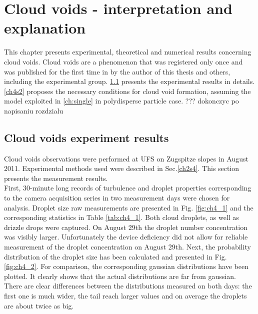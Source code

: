 \documentclass[../main.tex]{subfiles}
\begin{document}
\chapter{Cloud voids - interpretation and explanation} %

\label{ch:holes} %

This chapter presents experimental, theoretical and numerical results concerning cloud voids. Cloud voids are a phenomenon that was registered only once and was published for the first time in \citet{Karpinska2019} by the author of this thesis and others, including the experimental group. \ref{ch4s1} presents the experimental results in details. \ref{ch4s2} proposes the necessary conditions for cloud void formation, assuming the model exploited in \autoref{ch:single} in polydisperse particle case. ??? dokonczyc po napisaniu rozdzialu

\section{Cloud voids experiment results}
\label{ch4s1}
Cloud voids observations were performed at UFS on Zugspitze slopes in August 2011. Experimental methods used were described in Sec.\autoref{ch2s4}. This section presents the measurement results.\\
First, 30-minute long records of turbulence and droplet properties corresponding to the camera acquisition series in two measurement days were chosen for analysis. Droplet size raw measurements are presented in Fig. \ref{fig:ch4_1} and the corresponding statistics in Table \ref{tab:ch4_1}. Both cloud droplets, as well as drizzle drops were captured. On August 29th the droplet number concentration was visibly larger. Unfortunately the device deficiency did not allow for reliable measurement of the droplet concentration on August 29th. Next, the probability distribution of the droplet size has been calculated and presented in Fig.\ref{fig:ch4_2}. For comparison, the corresponding gaussian distributions have been plotted. It clearly shows that the actual distributions are far from gaussian. There are clear differences between the distributions measured on both days: the first one is much wider, the tail reach larger values and on average the droplets are about twice as big.
\end{document}
